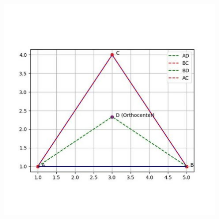 \documentclass[journal]{IEEEtran}
\begin{document}
\begin{figure}[h]
    \centering
    \includegraphics[scale=0.5]{figs/2.10.5.jpg}
    \caption{}
    \label{fig:1}
\end{figure}
\end{document}

